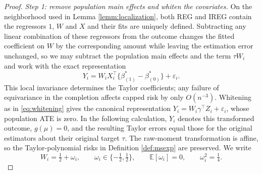 \documentclass{article}
\newcommand{\EEE}{\mathbb{E}}
\theoremstyle{plain}
\theoremstyle{definition}
\theoremstyle{remark}
\begin{document}
\begin{proof}
\emph{Step 1: remove population main effects and whiten the covariates.}
On the neighborhood used in Lemma \ref{lemm:localization}, both REG and IREG contain the regressors $1$, $W$ and $X$ and their fits are uniquely defined.
Subtracting any linear combination of these regressors from the outcome changes the fitted coefficient on $W$ by the corresponding amount while leaving the estimation error unchanged, so we may subtract the population main effects and the term $\tau W_i$ and work with the exact representation
\[
Y_i
=
W_i X_i^\top\{\beta^*_{(1)}-\beta^*_{(0)}\}
+\varepsilon_i.
\]
This local invariance determines the Taylor coefficients; any failure of equivariance in the completion affects capped risk by only $O(n^{-3})$. Whitening as in \eqref{eq:whitening} gives the canonical  representation
$Y_i=W_i\gamma^\top Z_i+\varepsilon_i$, whose population ATE is
zero. In the following calculation, $Y_i$ denotes this transformed
outcome, $g(\mu)=0$, and the resulting Taylor errors equal those
for the original estimators about their original target $\tau$.
The raw-moment transformation is affine, so the Taylor-polynomial
risks in Definition \ref{def:msexp} are preserved. We write
\[
W_i=\tfrac12+\omega_i,
\qquad
\omega_i\in\{-\tfrac12,\tfrac12\},
\qquad
\EEE[\omega_i]=0,
\qquad
\omega_i^2=\tfrac14.
\]


\end{proof}
\end{document}
